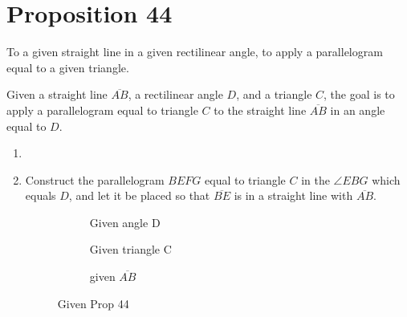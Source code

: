 
\section*{Proposition 44}

\renewcommand\qedsymbol{Q.E.F}

\begin{con}
To a given straight line in a given rectilinear angle, to apply a parallelogram equal to a given triangle.
\end{con}

Given a straight line $\overline{AB}$, a rectilinear angle $D$, and a triangle $C$, the goal is to apply a parallelogram equal to triangle $C$ to the straight line $\overline{AB}$ in an angle equal to $D$.

\begin{con}

\begin{enumerate}

\item[]

  \item Construct the parallelogram $BEFG$ equal to triangle $C$ in the $\angle{EBG}$ which equals $D$, and let it be placed so that $\overline{BE}$ is in a straight line with $\overline{AB}$.

\begin{figure}[H]  
	\begin{subfigure}{0.3\textwidth}
		\caption{Given angle D}
	\end{subfigure}
	\begin{subfigure}{0.3\textwidth}
		\caption{Given triangle C}
	\end{subfigure}
	\begin{subfigure}{0.3\textwidth}
		\caption{given $\overline{AB}$}
	\end{subfigure}
	\caption{Given Prop 44}
\end{figure}


\end{enumerate}
\end{con}
